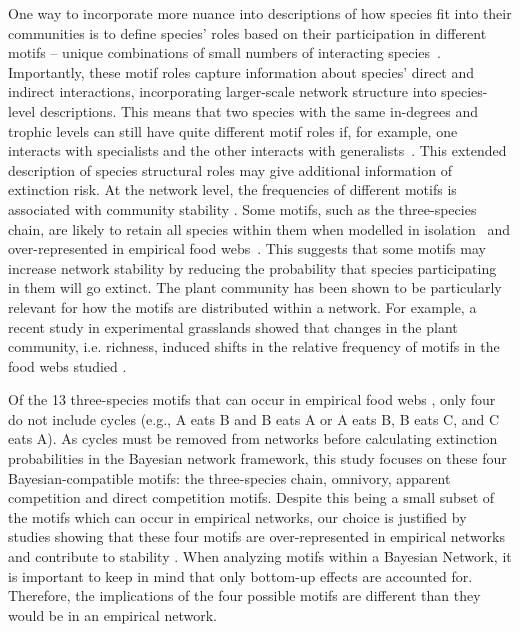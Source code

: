 \documentclass[12pt]{article}
\begin{document}
\begin{spacing}{2.0}
    
    One way to incorporate more nuance into descriptions of how species fit into their communities is to define species' roles based on their participation in different motifs -- unique combinations of small numbers of interacting species~\citep{Stouffer2007,Stouffer2012}. Importantly, these motif roles capture information about species' direct and indirect interactions, incorporating larger-scale network structure into species-level descriptions.
    This means that two species with the same in-degrees and trophic levels can still have quite different motif roles if, for example, one interacts with specialists and the other interacts with generalists~\citep{Cirtwill2018FoodWebs}. This extended description of species structural roles may give additional information of extinction risk. 
    At the network level, the frequencies of different motifs is associated with community stability \citep{prill2005dynamic, bascompte2005simple}.
    Some motifs, such as the three-species chain, are likely to retain all species within them when modelled in isolation~\citep{Borrelli2015a} and over-represented in empirical food webs~\citep{Stouffer2007}.
    This suggests that some motifs may increase network stability by reducing the probability that species participating in them will go extinct.
    The plant community has been shown to be particularly relevant for how the motifs are distributed within a network. For example, a recent study in experimental grasslands showed that changes in the plant community, i.e. richness, induced shifts in the relative frequency of motifs in the food webs studied \cite{giling2019plant}. 
    
    Of the 13 three-species motifs that can occur in empirical food webs
    \citep{Milo2004}, only four do not include cycles (e.g., A eats B and B eats A or A eats B, B eats C, and C eats A). 
    As cycles must be removed from networks before calculating extinction probabilities in the Bayesian network framework, this study focuses on these four Bayesian-compatible motifs: the three-species chain, omnivory, apparent competition and direct competition motifs. 
    Despite this being a small subset of the motifs which can occur in empirical networks, our choice is justified by studies showing that these four motifs are over-represented in empirical networks and contribute to stability \citep{Stouffer2007, Borrelli2015a, giling2019plant}.   
    When analyzing motifs within a Bayesian Network, it is important to keep in mind that only bottom-up effects are accounted for. Therefore, the implications of the four possible motifs are different than they would be in an empirical network.
    

\end{spacing}
\end{document}
